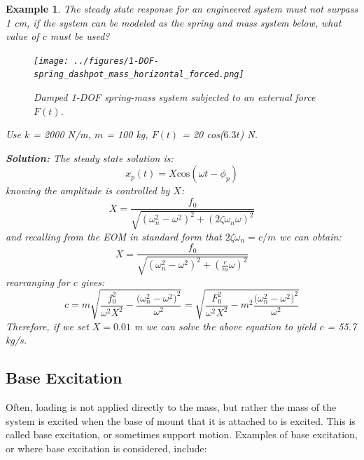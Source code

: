 \documentclass[12pt,letter]{article}
\newtheorem{ex}{Example}
\numberwithin{ex}{section} %
\newenvironment{example}{\begin{mdframed}[middlelinewidth=0.5mm]\begin{ex}\normalfont}{\end{ex}\end{mdframed}}
\numberwithin{re}{section} %
\begin{document}
\begin{example}

		

			The steady state response for an engineered system must not surpass 1 cm, if the system can be modeled as the spring and mass system below, what value of $c$ must be used?  
			\begin{figure}[H]
				\centering
				\texttt{[image: ../figures/1-DOF-spring\_dashpot\_mass\_horizontal\_forced.png]}
				\caption{Damped 1-DOF spring-mass system subjected to an external force $F(t)$.}
			\end{figure}	
			\noindent Use $k$ = 2000 N/m, $m$ = 100 kg, $F(t)$ = 20 cos($6.3t$) N. 			

			\noindent\textbf{Solution:} The steady state solution is:
			\begin{equation}
				x_p(t) = X \text{cos}(\omega t - \phi_p)
			\end{equation}			 
			knowing the amplitude is controlled by $X$: 
			\begin{equation}
				X = \frac{f_0}{\sqrt{(\omega_n^2 - \omega^2)^2 +  (2\zeta \omega_n \omega)^2}} 
			\end{equation}	
			and recalling from the EOM in standard form that $2\zeta \omega_n = c/m$ we can obtain:
			\begin{equation}
				X = \frac{f_0}{\sqrt{(\omega_n^2 - \omega^2)^2 +  (\frac{c}{m} \omega)^2}} 
			\end{equation}		
			rearranging for $c$ gives:		
			\begin{equation}
				c = m\sqrt{\frac{f_0^2}{\omega^2 X^2}-\frac{\big(\omega_n^2-\omega^2\big)^2}{\omega^2}} = \sqrt{\frac{F_0^2}{\omega^2 X^2}-m^2\frac{\big(\omega_n^2-\omega^2\big)^2}{\omega^2}} 
			\end{equation}
			Therefore, if we set $X=0.01$ m we can solve the above equation to yield $c$ = 55.7 kg/s.
			
\end{example}	


	
		\subsection{Base Excitation}

			Often, loading is not applied directly to the mass, but rather the mass of the system is excited when the base of mount that it is attached to is excited. This is called base excitation, or sometimes support motion. Examples of base excitation, or where base excitation is considered, include:
			
\end{document}
